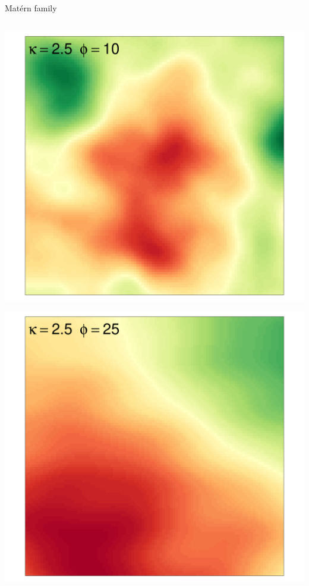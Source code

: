 \documentclass[
  ignorenonframetext,
]{beamer}
\begin{document}
\begin{frame}{Matérn family}
\begin{columns}[T]
\begin{column}{0.33\textwidth}
\includegraphics{Lecture_1_files/figure-beamer/unnamed-chunk-40-1.pdf}

\includegraphics{Lecture_1_files/figure-beamer/unnamed-chunk-41-1.pdf}
\end{column}


\end{columns}
\end{frame}
\end{document}
